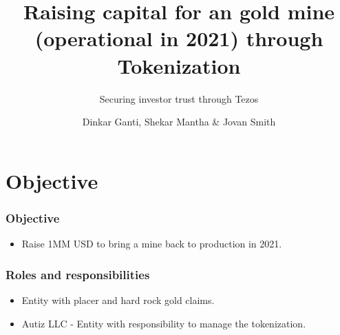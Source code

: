 \documentclass{beamer}
\title{Raising capital for an gold mine (operational in 2021) through Tokenization}
\subtitle{Securing investor trust through Tezos}
\author[Dinkar Ganti, Shekar Mantha \& Jovan Smith] {Dinkar Ganti, Shekar Mantha \& Jovan Smith}
\institute[Autiz LLC]
\begin{document}
\begin{frame}
 \maketitle
\end{frame}


\section{Objective}
\begin{frame}
\frametitle{Objective}
\begin{minipage}{\textwidth}
	\begin{itemize}
    \item  Raise 1MM USD to bring a mine back to production in 2021.
  \end{itemize}

\end{minipage}
\end{frame}

\begin{frame}
\frametitle{Roles and responsibilities}
\begin{minipage}{\textwidth}
  \begin{itemize}
    \item  Entity with placer and hard rock gold claims.
    \item  Autiz LLC - Entity with responsibility to manage the tokenization.
  \end{itemize}
\end{minipage}
\end{frame}
\end{document}
